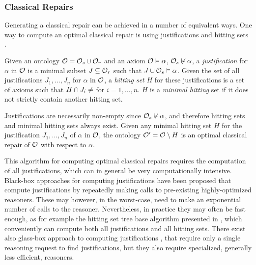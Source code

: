 \subsubsection{Classical Repairs} \label{classical-repairs}

Generating a classical repair can be achieved in a number of equivalent ways. One way to compute an optimal classical repair is using justifications and hitting sets \cite{reiter1987theory}.

\begin{definition}
Given an ontology $\mathcal{O} = \mathcal{O}_s \cup \mathcal{O}_r$ and an axiom $\mathcal{O} \vDash \alpha$, $\mathcal{O}_s \not\vDash \alpha$, a \emph{justification} for $\alpha$ in $\mathcal{O}$ is a minimal subset $J \subseteq \mathcal{O}_r$ such that $J \cup \mathcal{O}_s \vDash \alpha$. Given the set of all justifications $J_1, \dots, J_n$ for $\alpha$ in $\mathcal{O}$, a \emph{hitting set} $H$ for these justifications is a set of axioms such that $H \cap J_i \not= \empty$ for $i = 1, \dots, n$. $H$ is a \emph{minimal hitting} set if it does not strictly contain another hitting set.
\end{definition}

\begin{example}
\end{example}

Justifications are necessarily non-empty since $\mathcal{O}_s \not\vDash \alpha$, and therefore hitting sets and minimal hitting sets always exist. Given any minimal hitting set $H$ for the justification $J_1, \dots, J_n$ of $\alpha$ in $\mathcal{O}$, the ontology $\mathcal{O}' = \mathcal{O} \setminus H$ is an optimal classical repair of $\mathcal{O}$ with respect to $\alpha$.

This algorithm for computing optimal classical repairs requires the computation of all justifications, which can in general be very computationally intensive. Black-box approaches for computing justifications have been proposed \cite{kalyanpur2007finding,schlobach2003non,schlobach2007debugging} that compute justifications by repeatedly making calls to pre-existing highly-optimized reasoners. These may however, in the worst-case, need to make an exponential number of calls to the reasoner. Nevertheless, in practice they may often be fast enough, as for example the hitting set tree base algorithm presented in \cite{kalyanpur2007finding}, which conveniently can compute both all justifications and all hitting sets. There exist also glass-box approach to computing justifications \cite{kalyanpur2007finding}, that require only a single reasoning request to find justifications, but they also require specialized, generally less efficient, reasoners.

